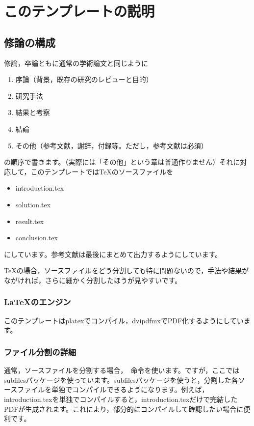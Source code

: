 \documentclass[./Main.tex]{subfiles}
\begin{document}
\setcounter{chapter}{-1}
\chapter{このテンプレートの説明}
\section{修論の構成}
修論，卒論ともに通常の学術論文と同じように

\begin{enumerate}
    \item 序論（背景，既存の研究のレビューと目的）
    \item 研究手法
    \item 結果と考察
    \item 結論
    \item その他（参考文献，謝辞，付録等。ただし，参考文献は必須）
\end{enumerate}
の順序で書きます。（実際には「その他」という章は普通作りません）それに対応して，このテンプレートではTeXのソースファイルを
\begin{itemize}
    \item introduction.tex
    \item solution.tex
    \item result.tex
    \item conclusion.tex
\end{itemize}
にしています。参考文献は最後にまとめて出力するようにしています。

TeXの場合，ソースファイルをどう分割しても特に問題ないので，手法や結果がながければ，さらに細かく分割したほうが見やすいです。

\subsection{LaTeXのエンジン}
このテンプレートはplatexでコンパイル，dvipdfmxでPDF化するようにしています。

\subsection{ファイル分割の詳細}
通常，ソースファイルを分割する場合，\verb| |命令を使います。ですが，ここではsubfilesパッケージを使っています。subfilesパッケージを使うと，分割した各ソースファイルを単独でコンパイルできるようになります。例えば，introduction.texを単独でコンパイルすると，introduction.texだけで完結したPDFが生成されます。これにより，部分的にコンパイルして確認したい場合に便利です。
\end{document}
